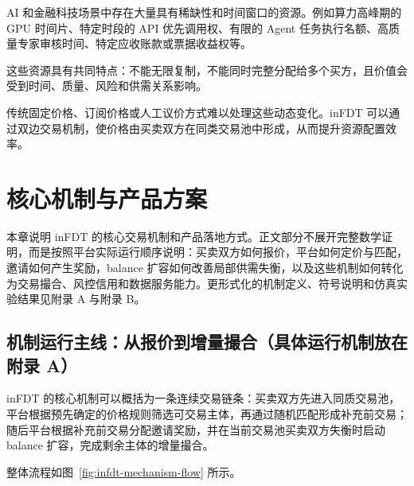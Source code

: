 \documentclass[UTF8,a4paper,12pt]{ctexart}
\begin{document}
AI 和金融科技场景中存在大量具有稀缺性和时间窗口的资源。例如算力高峰期的 GPU 时间片、特定时段的 API 优先调用权、有限的 Agent 任务执行名额、高质量专家审核时间、特定应收账款或票据收益权等。

这些资源具有共同特点：不能无限复制，不能同时完整分配给多个买方，且价值会受到时间、质量、风险和供需关系影响。

传统固定价格、订阅价格或人工议价方式难以处理这些动态变化。inFDT 可以通过双边交易机制，使价格由买卖双方在同类交易池中形成，从而提升资源配置效率。


\newpage

\section{核心机制与产品方案}

本章说明 inFDT 的核心交易机制和产品落地方式。正文部分不展开完整数学证明，而是按照平台实际运行顺序说明：买卖双方如何报价，平台如何定价与匹配，邀请如何产生奖励，balance 扩容如何改善局部供需失衡，以及这些机制如何转化为交易撮合、风控信用和数据服务能力。更形式化的机制定义、符号说明和仿真实验结果见附录 A 与附录 B。

\subsection{机制运行主线：从报价到增量撮合（具体运行机制放在附录 A）}

inFDT 的核心机制可以概括为一条连续交易链条：买卖双方先进入同质交易池，平台根据预先确定的价格规则筛选可交易主体，再通过随机匹配形成补充前交易；随后平台根据补充前交易分配邀请奖励，并在当前交易池买卖双方失衡时启动 balance 扩容，完成剩余主体的增量撮合。

整体流程如图~\ref{fig:infdt-mechanism-flow} 所示。
\end{document}
